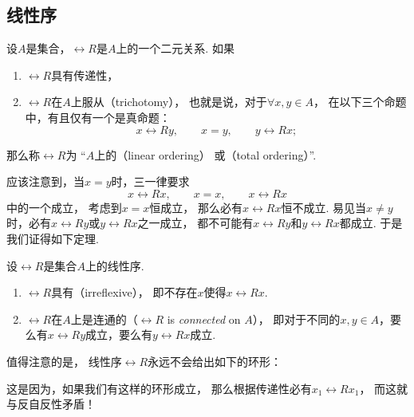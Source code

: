 \subsection{线性序}
\begin{definition}
设\(A\)是集合，\(\rel{R}\)是\(A\)上的一个二元关系.
如果\begin{enumerate}
	\item \(\rel{R}\)具有传递性，
	\item \(\rel{R}\)在\(A\)上服从（trichotomy），
	也就是说，对于\(\forall x,y \in A\)，
	在以下三个命题中，有且仅有一个是真命题：\[
		x \rel{R} y, \qquad
		x = y, \qquad
		y \rel{R} x;
	\]
\end{enumerate}
那么称\(\rel{R}\)为%
“\(A\)上的（linear ordering）%
或（total ordering）”.
\end{definition}

应该注意到，当\(x = y\)时，三一律要求\[
	x \rel{R} x, \qquad
	x = x, \qquad
	x \rel{R} x
\]中的一个成立，
考虑到\(x = x\)恒成立，
那么必有\(x \rel{R} x\)恒不成立.
易见当\(x \neq y\)时，必有\(x \rel{R} y\)或\(y \rel{R} x\)之一成立，
都不可能有\(x \rel{R} y\)和\(y \rel{R} x\)都成立.
于是我们证得如下定理.

\begin{theorem}
设\(\rel{R}\)是集合\(A\)上的线性序.
\begin{enumerate}
	\item {\rm \(\rel{R}\)具有（irreflexive）}，
	即不存在\(x\)使得\(x \rel{R} x\).

	\item {\rm \(\rel{R}\)在\(A\)上是连通的（\(\rel{R}\) is \emph{connected} on \(A\)）}，
	即对于不同的\(x,y \in A\)，要么有\(x \rel{R} y\)成立，要么有\(y \rel{R} x\)成立.
\end{enumerate}
\end{theorem}

值得注意的是，
线性序\(\rel{R}\)永远不会给出如下的环形：
\begin{center}
\end{center}
这是因为，如果我们有这样的环形成立，
那么根据传递性必有\(x_1 \rel{R} x_1\)，
而这就与反自反性矛盾！

